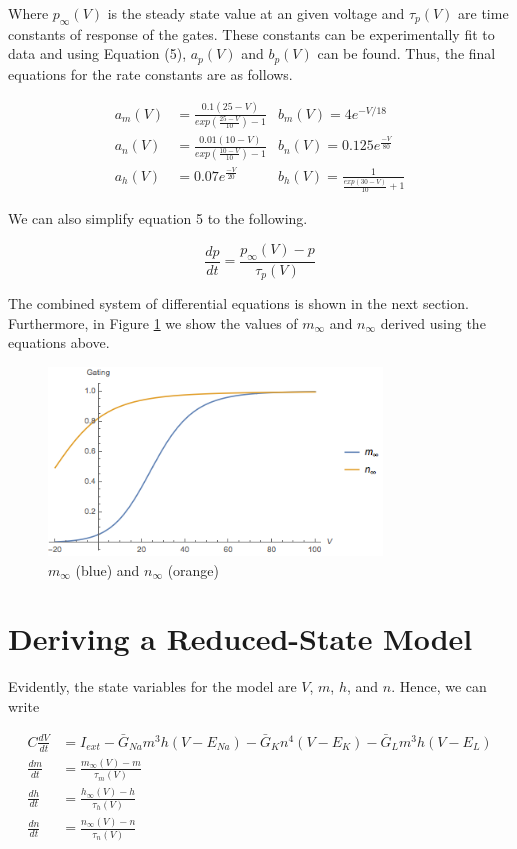 \documentclass{article}
\begin{document}
Where $p_{\infty}(V)$ is the steady state value at an given voltage and ${\tau_p}(V)$ are time constants of response of the gates. These constants can be experimentally fit to data and using Equation (5), $a_p(V)$ and $b_p(V)$ can be found. Thus, the final equations for the rate constants are as follows.

\begin{align*}
    a_m(V) &= \frac{0.1(25-V)}{exp(\frac{25-V}{10})-1}
    &b_m(V) = 4e^{-V/18} \\
    a_n(V) &= \frac{0.01(10-V)}{exp(\frac{10-V}{10})-1} 
    &b_n(V) = 0.125e^{\frac{-V}{80}}\\
    a_h(V) &= 0.07e^{\frac{-V}{20}} 
    &b_h(V) = \frac{1}{\frac{exp(30-V)}{10}+1}
\end{align*}

We can also simplify equation 5 to the following.

\begin{equation}
    \frac{dp}{dt} = \frac{p_{\infty}(V)-p}{\tau_p(V)}
\end{equation}

The combined system of differential equations is shown in the next section. Furthermore, in Figure \ref{fig:inf} we show the values of $m_\infty$ and $n_\infty$ derived using the equations above. 

\begin{figure}
\centering
	\includegraphics[height=5cm]{gating.png}
	\caption{$m_{\infty}$ (blue) and $n_{\infty}$ (orange)}
		\label{fig:inf}
\end{figure}

\section{Deriving a Reduced-State Model}

Evidently, the state variables for the model are $V$, $m$, $h$, and $n$. Hence, we can write

\begin{align*}
    C\frac{dV}{dt} &= I_{ext} -\bar{G}_{Na}m^3h(V-E_{Na}) -\bar{G}_{K}n^4(V-E_{K})  -\bar{G}_{L}m^3h(V-E_{L}) \\
    \frac{dm}{dt} &= \frac{m_{\infty}(V)-m}{\tau_m(V)} \\
    \frac{dh}{dt} &= \frac{h_{\infty}(V)-h}{\tau_h(V)} \\
    \frac{dn}{dt} &= \frac{n_{\infty}(V)-n}{\tau_n(V)} 
\end{align*}
\end{document}
